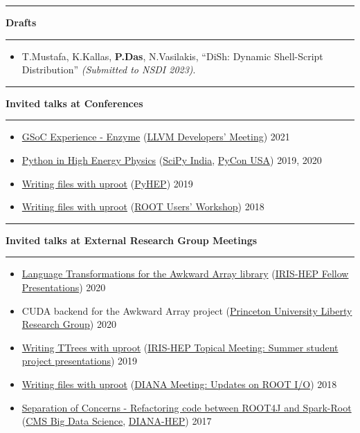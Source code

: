 \documentclass[10pt, letterpaper]{article}
\newcommand{\Section}[1]{
    \Line \par
    \vspace{1pt}
    \textbf{\fontsize{13}{13}\selectfont #1} \par
    \vspace{-7pt}
    \Line \par
    \vspace{3pt}
}
\newcommand{\Line}{
\noindent\rule{\textwidth}{0.4pt}}
\newenvironment{tightitemize}
{
    \vspace{-\topsep}
    \begin{itemize}
        \itemsep2pt \parskip0pt \parsep0pt
}
{
    \end{itemize}
    \vspace{-\topsep}
}
\begin{document}
\Section{Drafts}
\begin{tightitemize}
\item T.Mustafa, K.Kallas, \textbf{P.Das}, N.Vasilakis, ``DiSh: Dynamic Shell-Script Distribution'' \textit{(Submitted to NSDI 2023)}.
\end{tightitemize}

%
%
\Section{Invited talks at Conferences}
\begin{tightitemize}
\item \href{https://youtu.be/mxI9fYbpndI}{GSoC Experience - Enzyme} (\href{https://llvm.swoogo.com/2021devmtg/}{LLVM Developers' Meeting}) \hfill{2021}
\item \href{https://youtu.be/jClVsR6XfdI}{Python in High Energy Physics} (\href{https://scipy.in/2019}{SciPy India}, \href{https://us.pycon.org/2020/}{PyCon USA}) \hfill{2019, 2020}
\item \href{https://indico.cern.ch/event/833895/contributions/3577892/attachments/1927752/3191883/uproot-pyhep.pdf}{Writing files with uproot} (\href{https://indico.cern.ch/event/833895/}{PyHEP}) \hfill{2019}
\item \href{https://indico.cern.ch/event/697389/contributions/3102807/attachments/1713054/2762448/Writing_files_with_uproot.pdf}{Writing files with uproot} (\href{https://indico.cern.ch/event/697389/}{ROOT Users' Workshop}) \hfill{2018}
\end{tightitemize}

\Section{Invited talks at External Research Group Meetings}
\begin{tightitemize}
\item \href{https://indico.cern.ch/event/946427/contributions/3976986/attachments/2094014/3519161/IRIS-HEP-Fellow-Awkward.pdf}{Language Transformations for the Awkward Array library} (\href{https://indico.cern.ch/event/946427/}{IRIS-HEP Fellow Presentations}) \hfill{2020}
\item CUDA backend for the Awkward Array project (\href{https://liberty.princeton.edu/}{Princeton University Liberty Research Group}) \hfill{2020}
\item \href{https://indico.cern.ch/event/840667/contributions/3527109/attachments/1908764/3153297/uproot-irisfellow-final.pdf}{Writing TTrees with uproot} (\href{https://indico.cern.ch/event/840667/}{IRIS-HEP Topical Meeting: Summer student project presentations}) \hfill{2019}
\item \href{https://indico.cern.ch/event/754335/contributions/3166239/attachments/1734208/2804184/Writing_files_with_uproot_-_DIANA_HEP.pdf}{Writing files with uproot} (\href{https://indico.cern.ch/event/754335/}{DIANA Meeting: Updates on ROOT I/O}) \hfill{2018}
\item \href{https://indico.cern.ch/event/658754/contributions/2685907/attachments/1506368/2347492/Refactoring_code_from_spark-root_to_root4j.pdf}{Separation of Concerns - Refactoring code between ROOT4J and Spark-Root} (\href{https://indico.cern.ch/event/658754/}{CMS Big Data Science}, \href{https://indico.cern.ch/event/655833/}{DIANA-HEP}) \hfill{2017}
\end{tightitemize}
\end{document}
